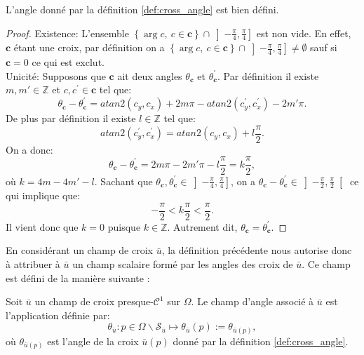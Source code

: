 \begin{lemma}
    L'angle donné par la définition \ref{def:cross_angle} est bien défini.
\end{lemma}

\begin{proof}
    Existence: L'ensemble $\left\{\arg c,~c\in \mathbf{c}\right\} \cap \left]-\frac{\pi}{4},\frac{\pi}{4}\right]$ est non vide. En effet, $\mathbf{c}$ étant une croix, par définition on a $\left\{\arg c,~c\in \mathbf{c}\right\} \cap \left]-\frac{\pi}{4},\frac{\pi}{4}\right]\neq\emptyset$ sauf si $\mathbf{c}=0$ ce qui est exclut.\\
    Unicité: Supposons que $\mathbf{c}$ ait deux angles $\theta_{\mathbf{c}}$ et $\theta^{'}_{\mathbf{c}}$. Par définition il existe $m, m'\in\mathbb{Z}$ et $c,c^{'}\in\mathbf{c}$ tel que:
    $$
    \theta_{\mathbf{c}}-\theta^{'}_{\mathbf{c}}=atan2(c_y, c_x)+2m\pi-atan2(c^{'}_y, c^{'}_x)-2m'\pi.
    $$
    De plus par définition il existe $l\in\mathbb{Z}$ tel que:
    $$
    atan2(c^{'}_y,c^{'}_x)=atan2(c_y,c_x)+l\frac{\pi}{2}.
    $$
    On a donc:
    $$
    \theta_{\mathbf{c}}-\theta^{'}_{\mathbf{c}}=2m\pi-2m'\pi-l\frac{\pi}{2}=k\frac{\pi}{2},
    $$
    où $k=4m-4m'-l$.
    Sachant que $\theta_{\mathbf{c}},\theta_{\mathbf{c}}^{'}\in\left]-\frac{\pi}{4},\frac{\pi}{4}\right]$, on a $\theta_{\mathbf{c}}-\theta^{'}_{\mathbf{c}}\in\left]-\frac{\pi}{2},\frac{\pi}{2}\right[$ ce qui implique que:
    $$
    -\frac{\pi}{2}<k\frac{\pi}{2}<\frac{\pi}{2}.
    $$
    Il vient donc que $k=0$ puisque $k\in\mathbb{Z}$. Autrement dit, $\theta_{\mathbf{c}}=\theta_{\mathbf{c}}^{'}$.
\end{proof}


En considérant un champ de croix $\bar{u}$, la définition précédente nous autorise donc à attribuer à $\bar{u}$ un champ scalaire formé par les angles des croix de $\bar{u}$. Ce champ est défini de la manière suivante :

\begin{definition}
    Soit $\bar{u}$ un champ de croix presque-$\mathcal{C}^1$ sur $\Omega$. Le champ d'angle associé à $\bar{u}$ est l'application définie par:
    $$\theta_{\bar{u}}:p\in\Omega\backslash\mathcal{S}_{\bar{u}}\longmapsto\theta_{\bar{u}}(p):=\theta_{\bar{u}(p)},$$
    où $\theta_{\bar{u}(p)}$ est l'angle de la croix $\bar{u}(p)$ donné par la définition \ref{def:cross_angle}.
\end{definition}

